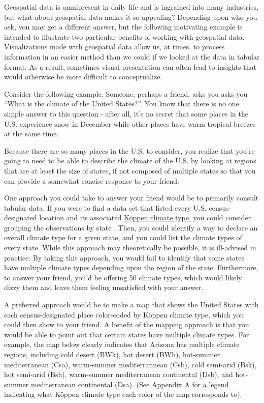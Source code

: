 \documentclass[12pt]{article}
\begin{document}
Geospatial data is omnipresent in daily life and is ingrained into many
industries, but what about geospatial data makes it so appealing?
Depending upon who you ask, you may get a different answer, but the
following motivating example is intended to illustrate two particular
benefits of working with geospatial data. Visualizations made with
geospatial data allow us, at times, to process information in an easier
method than we could if we looked at the data in tabular format. As a
result, sometimes visual presentation can often lead to insights that
would otherwise be more difficult to conceptualize.

Consider the following example. Someone, perhaps a friend, asks you asks
you ``What is the climate of the United States?''. You know that there
is no one simple answer to this question - after all, it's no secret
that some places in the U.S. experience snow in December while other
places have warm tropical breezes at the same time.

Because there are so many places in the U.S. to consider, you realize
that you're going to need to be able to describe the climate of the U.S.
by looking at regions that are at least the size of states, if not
composed of multiple states so that you can provide a somewhat concise
response to your friend.

One approach you could take to answer your friend would be to primarily
consult tabular data. If you were to find a data set that listed every
U.S. census-designated location and its associated
\href{https://en.wikipedia.org/wiki/K\%C3\%B6ppen_climate_classification}{Köppen
climate type}, you could consider grouping the observations by state
\citep{wikipediaKoppenClimateClassification2020}. Then, you could
identify a way to declare an overall climate type for a given state, and
you could list the climate types of every state. While this approach may
theoretically be possible, it is ill-advised in practice. By taking this
approach, you would fail to identify that some states have multiple
climate types depending upon the region of the state. Furthermore, to
answer your friend, you'd be offering 50 climate types, which would
likely dizzy them and leave them feeling unsatisfied with your answer.

A preferred approach would be to make a map that shows the United States
with each census-designated place color-coded by Köppen climate type,
which you could then show to your friend. A benefit of the mapping
approach is that you would be able to point out that certain states have
multiple climate types. For example, the map below clearly indicates
that Arizona has multiple climate regions, including cold desert (BWk),
hot desert (BWh), hot-summer mediterranean (Csa), warm-summer
mediterrannean (Csb), cold semi-arid (Bsk), hot semi-arid (Bsh),
warm-summer mediterranean continental (Dsb), and hot-summer
mediterranean continental (Dsa). (See Appendix A for a legend indicating
what Köppen climate type each color of the map corresponds to).
\end{document}
